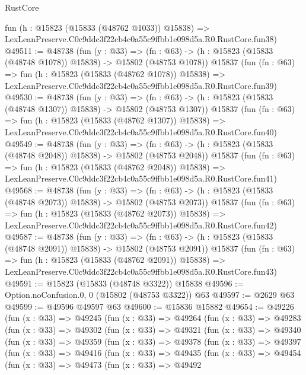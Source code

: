 \begin{lexlean}{RustCore}
\begin{coremodule}
    fun (h : @15823 (@15833 (@48762 @1033)) @15838) =>
    LexLeanPreserve.C0c9ddc3f22cb4c0a55c9ffbb1e098d5a.R0.RustCore.fun38)
@49511 := @48738
    (fun (y : @33) =>
    (fn : @63) -> (h : @15823 (@15833 (@48748 @1078)) @15838) -> @15802 (@48753 @1078))
    @15837
    (fun (fn : @63) =>
    fun (h : @15823 (@15833 (@48762 @1078)) @15838) =>
    LexLeanPreserve.C0c9ddc3f22cb4c0a55c9ffbb1e098d5a.R0.RustCore.fun39)
@49530 := @48738
    (fun (y : @33) =>
    (fn : @63) -> (h : @15823 (@15833 (@48748 @1307)) @15838) -> @15802 (@48753 @1307))
    @15837
    (fun (fn : @63) =>
    fun (h : @15823 (@15833 (@48762 @1307)) @15838) =>
    LexLeanPreserve.C0c9ddc3f22cb4c0a55c9ffbb1e098d5a.R0.RustCore.fun40)
@49549 := @48738
    (fun (y : @33) =>
    (fn : @63) -> (h : @15823 (@15833 (@48748 @2048)) @15838) -> @15802 (@48753 @2048))
    @15837
    (fun (fn : @63) =>
    fun (h : @15823 (@15833 (@48762 @2048)) @15838) =>
    LexLeanPreserve.C0c9ddc3f22cb4c0a55c9ffbb1e098d5a.R0.RustCore.fun41)
@49568 := @48738
    (fun (y : @33) =>
    (fn : @63) -> (h : @15823 (@15833 (@48748 @2073)) @15838) -> @15802 (@48753 @2073))
    @15837
    (fun (fn : @63) =>
    fun (h : @15823 (@15833 (@48762 @2073)) @15838) =>
    LexLeanPreserve.C0c9ddc3f22cb4c0a55c9ffbb1e098d5a.R0.RustCore.fun42)
@49587 := @48738
    (fun (y : @33) =>
    (fn : @63) -> (h : @15823 (@15833 (@48748 @2091)) @15838) -> @15802 (@48753 @2091))
    @15837
    (fun (fn : @63) =>
    fun (h : @15823 (@15833 (@48762 @2091)) @15838) =>
    LexLeanPreserve.C0c9ddc3f22cb4c0a55c9ffbb1e098d5a.R0.RustCore.fun43)
@49591 := @15823 (@15833 (@48748 @3322)) @15838
@49596 := Option.noConfusion.{0, 0} (@15802 (@48753 @3322)) @63
@49597 := @2629 @63
@49599 := @49596 @49597 @63
@49600 := @15836 @15882
@49654 := @49226
    (fun (x : @33) =>
    @49245
      (fun (x : @33) =>
      @49264
        (fun (x : @33) =>
        @49283
          (fun (x : @33) =>
          @49302
            (fun (x : @33) =>
            @49321
              (fun (x : @33) =>
              @49340
                (fun (x : @33) =>
                @49359
                  (fun (x : @33) =>
                  @49378
                    (fun (x : @33) =>
                    @49397
                      (fun (x : @33) =>
                      @49416
                        (fun (x : @33) =>
                        @49435
                          (fun (x : @33) =>
                          @49454
                            (fun (x : @33) =>
                            @49473
                              (fun (x : @33) =>
                              @49492

\end{coremodule}
\end{lexlean}
